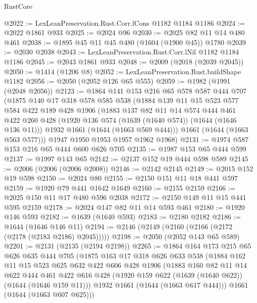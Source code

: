 \begin{lexlean}{RustCore}
\begin{coremodule}
@2022 := LexLeanPreservation.Rust.Corr.lCons @1182 @1184 @1186
@2024 := @2022 @1861 @933
@2025 := @2024 @96
@2030 := @2025 @82 @11 @14 @480 @461
@2038 := @1895 @45 @11 @45 @480 (@1604 (@1900 @45)) @1780
@2039 := @2030 @2038
@2043 := LexLeanPreservation.Rust.Corr.lNil @1182 @1184 @1186
@2045 := @2043 @1861 @933
@2048 := @2009 (@2018 (@2039 @2045))
@2050 := @1414 (@1206 @8)
@2052 := LexLeanPreservation.Rust.buildShape @1182
@2056 := @2050 (@2052 @126 @65 @555)
@2059 := @1982 (@1991 (@2048 @2056))
@2123 := @1864
    @141
    @153
    @216
    @65
    @578
    @587
    @444
    @707
    (@1875
      @140
      @17
      @318
      @578
      @585
      @538
      (@1884
        @139
        @11
        @15
        @523
        @577
        @584
        @422
        @189
        @428
        @1906
        (@1883
          @137
          @82
          @11
          @14
          @574
          @444
          @461
          @422
          @260
          @428
          (@1920 @136 @574 (@1639 (@1640 @574)) (@1644 (@1646 @136 @11)))
          @1932
          @1661
          (@1644 (@1663 @569 @444)))
        @1661
        (@1644 (@1663 @563 @577)))
      @1947
      @1950
      @1953
      @1957
      @1962
      @1968)
@2131 := @1974 @587 @153 @216 @65 @444 @600 @626 @705
@2135 := @1987 @153 @65 @444 @599
@2137 := @1997 @143 @65
@2142 := @2137 @152 @19 @444 @598 @589
@2145 := @2006 (@2006 (@2006 @2008))
@2146 := @2142 @2145
@2149 := @2015 @152 @19 @598
@2150 := @2024 @80
@2155 := @2150 @151 @11 @18 @441 @597
@2159 := @1920 @79 @441 @1642 @1649
@2160 := @2155 @2159
@2166 := @2025 @150 @11 @17 @480 @596 @2038
@2172 := @2150 @149 @11 @15 @441 @595 @2159
@2178 := @2024 @147 @82 @11 @14 @593 @461
@2180 := @1920 @146 @593
@2182 := @1639 (@1640 @593)
@2183 := @2180 @2182
@2186 := @1644 (@1646 @146 @11)
@2194 := @2146 (@2149 (@2160 (@2166 (@2172 (@2178 (@2183 @2186) @2045)))))
@2198 := @2050 (@2052 @143 @65 @589)
@2201 := @2131 (@2135 (@2194 @2198))
@2265 := @1864
    @164
    @173
    @215
    @65
    @626
    @635
    @444
    @705
    (@1875
      @163
      @17
      @318
      @626
      @633
      @538
      (@1884
        @162
        @11
        @15
        @523
        @625
        @632
        @422
        @606
        @428
        @1906
        (@1883
          @160
          @82
          @11
          @14
          @622
          @444
          @461
          @422
          @616
          @428
          (@1920 @159 @622 (@1639 (@1640 @622)) (@1644 (@1646 @159 @11)))
          @1932
          @1661
          (@1644 (@1663 @617 @444)))
        @1661
        (@1644 (@1663 @607 @625)))

\end{coremodule}
\end{lexlean}
